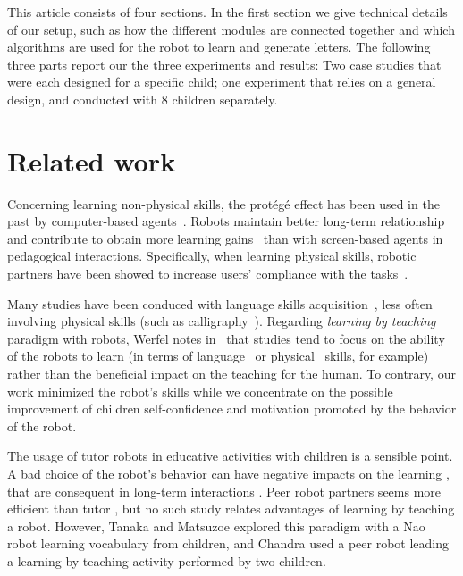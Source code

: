 \documentclass[conference]{IEEEtran}
\begin{document}
This article consists of four sections. In the first section we give technical details of our setup, such as how the different modules are connected
together and which algorithms are used for the robot to learn and generate letters.
The following three parts report our the three experiments and results: Two case studies that were each designed for a specific child; one experiment that relies on a general design, and conducted with 8 children separately.

\section{Related work}

Concerning learning non-physical skills, the prot\'eg\'e effect has been used in the past by computer-based agents~\cite{Chase2009}.
Robots maintain better long-term relationship~\cite{Kidd2008} and contribute to obtain more learning gains~\cite{Leyzberg2014} than with screen-based agents in pedagogical interactions. Specifically, when learning physical skills, robotic partners have been showed to increase users' compliance with the tasks~\cite{Bainbridge2011}.

Many studies have been conduced with language skills
acquisition~\cite{han2010robot}, less often involving physical skills (such as
calligraphy~\cite{Matsui2013}). Regarding \textit{learning by teaching} paradigm with
robots, Werfel notes in~\cite{Werfel2014} that studies tend to focus on the
ability of the robots to learn (in terms of language~\cite{Saunders2010} or
physical~\cite{Mulling2013} skills, for example) rather than the beneficial impact
on the teaching for the human. To contrary, our work minimized the robot's skills while we
concentrate on the possible improvement of children self-confidence and
motivation promoted by the behavior of the robot.

The usage of tutor robots in educative activities with children is a sensible point. A bad choice of the robot's behavior can have negative impacts on the learning \cite{kennedy2015robot}, that are consequent in long-term interactions \cite{leite2014empathic}. Peer robot partners seems more efficient than tutor \cite{zaga2015effect}, but no such study relates advantages of learning by teaching a robot. However, Tanaka and Matsuzoe \cite{Tanaka2012} explored this paradigm with a Nao robot learning vocabulary from children, and Chandra \cite{chandra2015can} used a peer robot leading a learning by teaching activity performed by two children.
\end{document}
